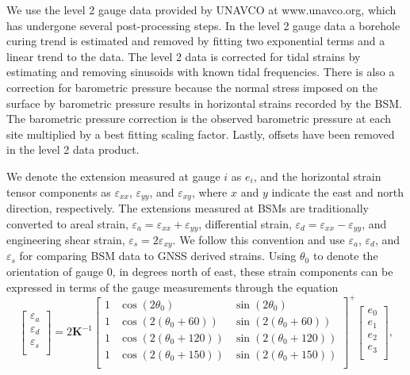 We use the level 2 gauge data provided by UNAVCO at www.unavco.org,
which has undergone several post-processing steps. In the level 2
gauge data a borehole curing trend is estimated and removed by fitting
two exponential terms and a linear trend to the data. The level 2 data
is corrected for tidal strains by estimating and removing sinusoids
with known tidal frequencies. There is also a correction for
barometric pressure because the normal stress imposed on the surface
by barometric pressure results in horizontal strains recorded by the
BSM. The barometric pressure correction is the observed barometric
pressure at each site multiplied by a best fitting scaling factor.
Lastly, offsets have been removed in the level 2 data product.

We denote the extension measured at gauge $i$ as $e_i$, and the
horizontal strain tensor components as $\varepsilon_{xx}$,
$\varepsilon_{yy}$, and $\varepsilon_{xy}$, where $x$ and $y$ indicate
the east and north direction, respectively. The extensions measured at
BSMs are traditionally converted to areal strain, $\varepsilon_a =
\varepsilon_{xx} + \varepsilon_{yy}$, differential strain,
$\varepsilon_d = \varepsilon_{xx} - \varepsilon_{yy}$, and engineering
shear strain, $\varepsilon_s = 2\varepsilon_{xy}$. We follow this
convention and use $\varepsilon_a$, $\varepsilon_d$, and
$\varepsilon_s$ for comparing BSM data to GNSS derived strains. Using
$\theta_0$ to denote the orientation of gauge 0, in degrees north of
east, these strain components can be expressed in terms of the gauge
measurements through the equation
\begin{equation}\label{eq:GaugeToStrain}
\left[\begin{array}{c}
\varepsilon_a \\
\varepsilon_d \\
\varepsilon_s \\
\end{array}\right]
=
2\mathbf{K}^{-1}\left[\begin{array}{ccc}
1 & \cos(2\theta_0) & \sin(2\theta_0) \\
1 & \cos(2(\theta_0 + 60)) & \sin(2(\theta_0 + 60)) \\
1 & \cos(2(\theta_0 + 120)) & \sin(2(\theta_0 + 120)) \\
1 & \cos(2(\theta_0 + 150)) & \sin(2(\theta_0 + 150)) \\
\end{array}\right]^+
\left[\begin{array}{c}
e_0 \\
e_1 \\
e_2 \\
e_3 \\
\end{array}\right],
\end{equation} 
